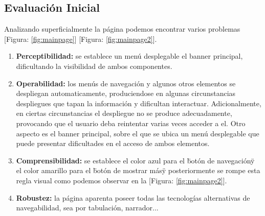 \documentclass{article}
\begin{document}
        \subsection{Evaluación Inicial}
            Analizando superficialmente la página podemos encontrar varios
             problemas [Figura: \ref{fig:mainpage}] [Figura: \ref{fig:mainpage2}].
            \begin{enumerate}
                \item \textbf{Perceptibilidad:} se establece un menú desplegable
                    el banner principal, dificultando la visibilidad de ambos
                    componentes.
                \item \textbf{Operabilidad:} los menús de navegación y algunos otros
                    elementos se despliegan automaticamente, produciendose en algunas
                    circunstancias despliegues que tapan la información y dificultan
                    interactuar. Adicionalmente, en ciertas circunstancias el
                    despliegue no se produce adecuadamente, provocando que el usuario
                    deba reintentar varias veces acceder a el.
                    Otro aspecto es el banner principal, sobre el que se ubica un menú
                    desplegable que puede presentar dificultades en el acceso de ambos
                    elementos.
                \item \textbf{Comprensibilidad:} se establece el color azul para el
                    \"botón de navegación\" y el color amarillo para el
                    \"botón de mostrar más\" y posteriormente se rompe esta regla
                    visual como podemos observar en la [Figura: \ref{fig:mainpage2}].
                \item \textbf{Robustez:} la página aparenta poseer todas las
                    tecnologías alternativas de navegabilidad, sea por tabulación,
                    narrador...
            \end{enumerate}
\end{document}
